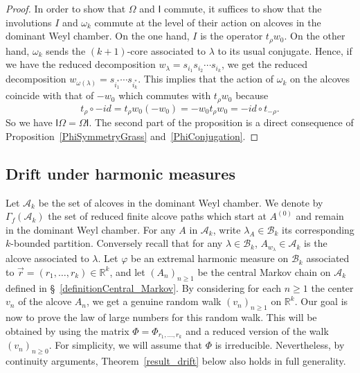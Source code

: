 \documentclass[ALCO,ThmDefs,Unicode,epreuves]{cedram}
\begin{document}
\begin{proof}
In order to show that $\Omega$ and $\mathsf{I}$ commute, it suffices to show
that the involutions $I$ and $\omega_{k}$ commute at the level of their action
on alcoves in the dominant Weyl chamber. On the one hand, $I$ is the operator
$t_{\rho}w_{0}$. On the other hand, $\omega_{k}$ sends the $(k+1)$-core
associated to $\lambda$ to its usual conjugate. Hence, if we have the reduced
decomposition $w_{\lambda}=s_{i_{1}}s_{i_{2}}\cdots s_{i_{k}}$, we get the
reduced decomposition $w_{\omega(\lambda)}=s_{i_{1}^{\ast}}\cdots
s_{i_{k}^{\ast}}.$ This implies that the action of $\omega_{k}$ on the alcoves
coincide with that of $-w_{0}$ which commutes with $t_{\rho}w_{0}$ because
\[
t_{\rho}\circ-id=t_{\rho}w_{0}(-w_{0})=-w_{0}t_{\rho}w_{0}=-id\circ t_{-\rho
}.
\]
So we have $\mathsf{I}\Omega=\Omega\mathsf{I}$. The second part of the
proposition is a direct consequence of Proposition~\ref{PhiSymmetryGrass} and~\eqref{PhiConjugation}.
\end{proof}

\subsection*{Drift under harmonic measures}

Let $\mathcal{A}_{k}$ be the set of alcoves in the dominant Weyl chamber. We
denote by $\Gamma_{f}(\mathcal{A}_{k})$ the set of reduced finite alcove paths
which start at $A^{(0)}$ and remain in the dominant Weyl chamber. For any $A$
in $\mathcal{A}_{k}$, write $\lambda_{A}\in\mathcal{B}_{k}$ its corresponding
$k$-bounded partition. Conversely recall that for any $\lambda\in
\mathcal{B}_{k}$, $A_{w_{\lambda}}\in\mathcal{A}_{k}$ is the alcove associated
to $\lambda$. Let $\varphi$ be an extremal harmonic measure on $\mathcal{B}%
_{k}$ associated to $\vec{r}=(r_{1},\ldots,r_{k})\in\mathbb{R}^{k}$, and let
$(A_{n})_{n\geq1}$ be the central Markov chain on $\mathcal{A}_{k}$ defined in
\S~\ref{definitionCentral_Markov}. By considering for each $n\geq1$ the
center $v_{n}$ of the alcove $A_{n}$, we get a genuine random walk
$(v_{n})_{n\geq1}$ on $\mathbb{R}^{k}$. Our goal is now to prove the law of
large numbers for this random walk. This will be obtained by using the matrix
$\Phi=\Phi_{r_{1},\ldots,r_{k}}$ and a reduced version of the walk
$(v_{n})_{n\geq0}$. For simplicity, we will assume that $\Phi$ is irreducible.
Nevertheless, by continuity arguments, Theorem~\ref{result_drift} below also
holds in full generality.
\end{document}
